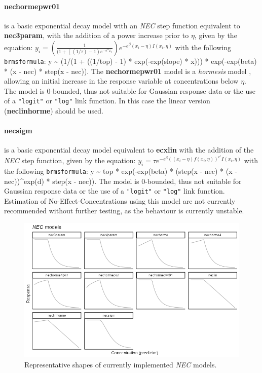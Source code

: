 \documentclass[
  shortnames]{jss}
\begin{document}
\hypertarget{nechormepwr01}{%
\paragraph{nechormepwr01}\label{nechormepwr01}}

is a basic exponential decay model with an \emph{NEC} step function equivalent to \textbf{nec3param}, with the addition of a power increase prior to \(\eta\), given by the equation:
\(y_i = \left(\frac{1}{(1 + ((1/\tau)-1) e^{-e^{\alpha}x_i}}\right) e^{-e^{\beta} \left(x_i - \eta \right) I(x_i, \eta)}\)
with the following \texttt{brmsformula}: y \textasciitilde{} (1/(1 + ((1/top) - 1) * exp(-exp(slope) * x))) * exp(-exp(beta) * (x - nec) * step(x - nec)). The \textbf{nechormepwr01} model is a \emph{hormesis} model \citep{Mattson2008}, allowing an initial increase in the response variable at concentrations below \(\eta\). The model is 0-bounded, thus not suitable for Gaussian response data or the use of a \texttt{"logit"} or \texttt{"log"} link function. In this case the linear version (\textbf{neclinhorme}) should be used.

\hypertarget{necsigm}{%
\paragraph{necsigm}\label{necsigm}}

is a basic exponential decay model equivalent to \textbf{ecxlin} with the addition of the \emph{NEC} step function, given by the equation:
\(y_i = \tau e^{-e^{\beta} ((x_i - \eta) f(x_i, \eta))^{e^\epsilon}I(x_i, \eta)}\)
with the following \texttt{brmsformula}: y \textasciitilde{} top * exp(-exp(beta) * (step(x - nec) * (x - nec))\^{}exp(d) * step(x - nec)). The model is 0-bounded, thus not suitable for Gaussian response data or the use of a \texttt{"logit"} or \texttt{"log"} link function. Estimation of No-Effect-Concentrations using this model are not currently recommended without further testing, as the behaviour is currently unstable.

\begin{figure}[ht]
  \centering
  \includegraphics[width=1\textwidth]{../vignettes/vignette-fig-exmp2b-theoretical_nec_curves.png}
  \caption{Representative shapes of currently implemented  \textit{NEC} models.}
  \label{fig2}
\end{figure}
\end{document}
